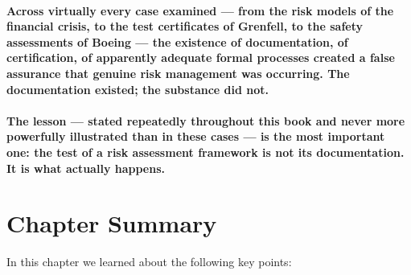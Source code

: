 \paragraph{Across virtually every case examined — from the risk models of the financial crisis, to the test certificates of Grenfell, to the safety assessments of Boeing — the existence of documentation, of certification, of apparently adequate formal processes created a false assurance that genuine risk management was occurring. The documentation existed; the substance did not.}
\paragraph{The lesson — stated repeatedly throughout this book and never more powerfully illustrated than in these cases — is the most important one: \textbf{the test of a risk assessment framework is not its documentation. It is what actually happens}.}

\newpage
\section{Chapter Summary}
In this chapter we learned about the following key points:

